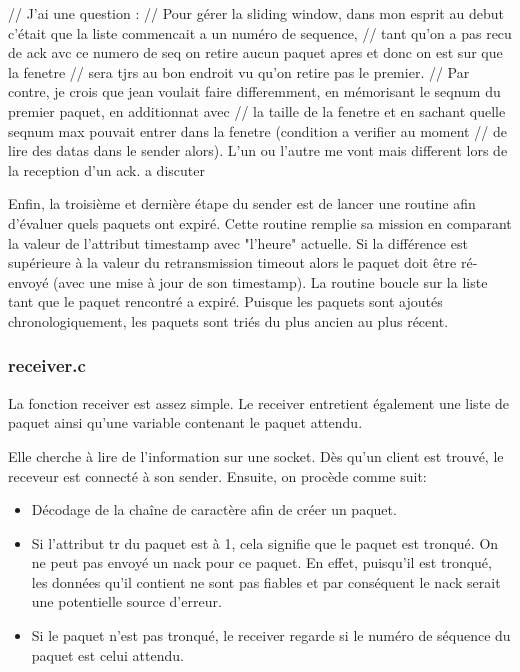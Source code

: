 \begin{itemize}
\begin{itemize}
\begin{itemize}
// J'ai une question :
// Pour gérer la sliding window, dans mon esprit au debut c'était que la liste commencait a un numéro de sequence,
// tant qu'on a pas recu de ack avc ce numero de seq on retire aucun paquet apres et donc on est sur que la fenetre
// sera tjrs au bon endroit vu qu'on retire pas le premier.
// Par contre, je crois que jean voulait faire differemment, en mémorisant le seqnum du premier paquet, en additionnat avec
// la taille de la fenetre et en sachant quelle seqnum max pouvait entrer dans la fenetre (condition a verifier au moment
// de lire des datas dans le sender alors). L'un ou l'autre me vont mais different lors de la reception d'un ack. a discuter

Enfin, la troisième et dernière étape du sender est de lancer une routine afin d'évaluer quels paquets ont expiré.
Cette routine remplie sa mission en comparant la valeur de l'attribut timestamp avec "l'heure" actuelle. Si la différence
est supérieure à la valeur du retransmission timeout alors le paquet doit être ré-envoyé (avec une mise à jour de son
timestamp). La routine boucle sur la liste tant que le paquet rencontré a expiré. Puisque les paquets sont ajoutés
chronologiquement, les paquets sont triés du plus ancien au plus récent.






\subsubsection{receiver.c}
 La fonction receiver est assez simple. Le receiver entretient également une liste de paquet ainsi qu'une variable contenant
 le paquet attendu.

 Elle cherche à lire de l'information sur une socket. Dès qu'un client est trouvé,
 le receveur est connecté à son sender. Ensuite, on procède comme suit:
 \begin{itemize}
 \item Décodage de la chaîne de caractère afin de créer un paquet.
 \item Si l'attribut tr du paquet est à 1, cela signifie que le paquet est tronqué. On ne peut pas envoyé un nack pour ce
 paquet. En effet, puisqu'il est tronqué, les données qu'il contient ne sont pas fiables et par conséquent le nack serait
 une potentielle source d'erreur.
 \item Si le paquet n'est pas tronqué, le receiver regarde si le numéro de séquence du paquet est celui attendu.


\end{itemize}
\end{itemize}
\end{itemize}
\end{itemize}
